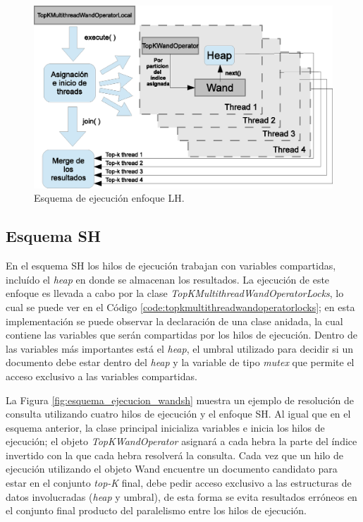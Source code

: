 \begin{figure}[th!]
\centering
\includegraphics[scale=.75]{images/ejecucion_topkmultithreadwandopLOCAL.eps}
\caption{Esquema de ejecución enfoque LH.}
\label{fig:esquema_ejecucion_wandlh}
\end{figure}

\subsection{Esquema SH}
\label{evaluacionexperimental:esquemash}
En el esquema SH los hilos de ejecución trabajan con variables compartidas, incluído el \textit{heap} en donde se almacenan los resultados. La ejecución de este enfoque es llevada a cabo por la clase \textit{TopKMultithreadWandOperatorLocks}, lo cual se puede ver en el Código \ref{code:topkmultithreadwandoperatorlocks}; en esta implementación se puede observar la declaración de una clase anidada, la cual contiene las variables que serán compartidas por los hilos de ejecución. Dentro de las variables más importantes está el \textit{heap}, el umbral utilizado para decidir si un documento debe estar dentro del \textit{heap} y la variable de tipo \textit{mutex} que permite el acceso exclusivo a las variables compartidas. 



La Figura \ref{fig:esquema_ejecucion_wandsh} muestra un ejemplo de resolución de consulta utilizando cuatro hilos de ejecución y el enfoque SH. Al igual que en el esquema anterior, la clase principal inicializa variables e inicia los hilos de ejecución; el objeto \textit{TopKWandOperator} asignará a cada hebra la parte del índice invertido con la que cada hebra resolverá la consulta. Cada vez que un hilo de ejecución utilizando el objeto Wand encuentre un documento candidato para estar en el conjunto \textit{top-K} final, debe pedir acceso exclusivo a las estructuras de datos involucradas (\textit{heap} y umbral), de esta forma se evita resultados erróneos en el conjunto final producto del paralelismo entre los hilos de ejecución.  

